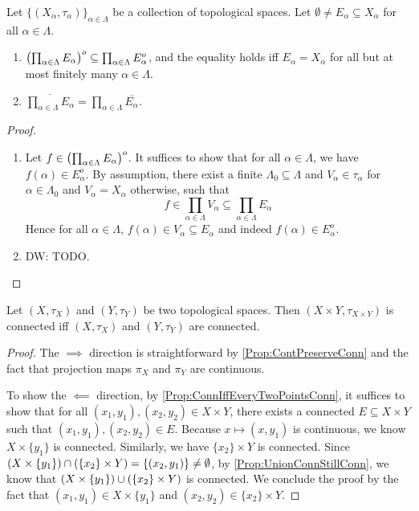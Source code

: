 \documentclass[screen]{techreport}
\numberwithin{equation}{section}
\newcommand{\diw}[1]{{\color{Red} DW: #1}}
\begin{document}
\begin{proposition}\label{Prop:IntProdSubProdIntAndCloProdEqProdClo}
	Let $\{(X_\alpha,\tau_\alpha)\}_{\alpha \in \Lambda}$ be a collection of topological spaces.
	Let $\emptyset \neq E_\alpha \subseteq X_\alpha$ for all $\alpha \in \Lambda$.
	\begin{enumerate}
		\item $\left({\prod_{\alpha \in \Lambda} E_\alpha}\right)^o \subseteq \prod_{\alpha \in \Lambda} E_\alpha^o$, and the equality holds iff $E_\alpha = X_\alpha$ for all but at most finitely many $\alpha \in \Lambda$.
		\item $\overline{\prod_{\alpha \in \Lambda} E_\alpha} = \prod_{\alpha \in \Lambda} \overline{E_\alpha}$.
	\end{enumerate}
\end{proposition}
\begin{proof}\
	\begin{enumerate}
		\item Let $f \in \left({\prod_{\alpha \in \Lambda} E_\alpha}\right)^o$.
		It suffices to show that for all $\alpha \in \Lambda$, we have $f(\alpha) \in E_\alpha^o$.
		By assumption, there exist a finite $\Lambda_0 \subseteq \Lambda$ and $V_\alpha \in \tau_\alpha$ for $\alpha \in \Lambda_0$ and $V_\alpha = X_\alpha$ otherwise, such that
		\[
		f \in \prod_{\alpha \in \Lambda} V_\alpha \subseteq \prod_{\alpha \in \Lambda} E_\alpha
		\]
		Hence for all $\alpha \in \Lambda$, $f(\alpha) \in V_\alpha \subseteq E_\alpha$ and indeed $f(\alpha) \in E_\alpha^o$.
		
		\item \diw{TODO.}
	\end{enumerate}
\end{proof}

\begin{proposition}\label{Prop:ProdConnIffBothConn}
	Let $(X,\tau_X)$ and $(Y,\tau_Y)$ be two topological spaces.
	Then $(X\times Y,\tau_{X \times Y})$ is connected iff $(X,\tau_X)$ and $(Y,\tau_Y)$ are connected.
\end{proposition}
\begin{proof}
	The $\implies$ direction is straightforward by \cref{Prop:ContPreserveConn} and the fact that projection maps $\pi_X$ and $\pi_Y$ are continuous.
	
	To show the $\impliedby$ direction, by \ref{Prop:ConnIffEveryTwoPointsConn}, it suffices to show that for all $(x_1,y_1),(x_2,y_2) \in X \times Y$, there exists a connected $E \subseteq X \times Y$ such that $(x_1,y_1),(x_2,y_2) \in E$.
	Because $x \mapsto (x,y_1)$ is continuous, we know $X \times \{y_1\}$ is connected.
	Similarly, we have $\{x_2\} \times Y$ is connected.
	Since $(X \times \left\{ {y_1} \right\}) \cap (\left\{ {x_2} \right\} \times Y) = \{ (x_2,y_1) \} \neq \emptyset$, by \cref{Prop:UnionConnStillConn}, we know that $(X \times \left\{ {y_1} \right\}) \cup (\left\{ {x_2} \right\} \times Y)$ is connected.
	We conclude the proof by the fact that $(x_1,y_1) \in X \times \{y_1\}$ and $(x_2,y_2) \in \{x_2\} \times Y$.
\end{proof}
\end{document}
